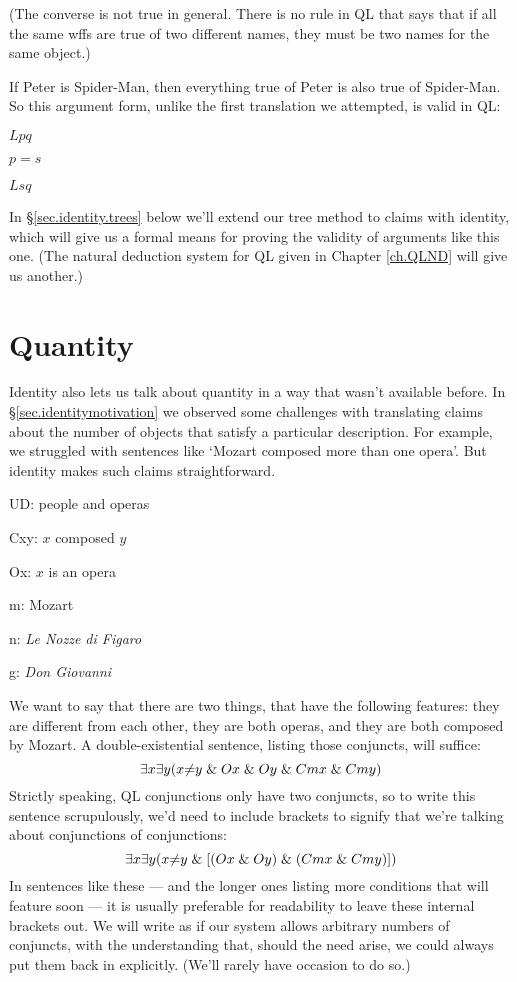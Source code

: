 (The converse is not true in general. There is no rule in QL that says that if all the same wffs are true of two different names, they must be two names for the same object.)

If Peter is Spider-Man, then everything true of Peter is also true of Spider-Man. So this argument form, unlike the first translation we attempted, is valid in QL:

\begin{earg}
\item[] $Lpq$
\item[] $p{=}s$
\item[\therefore] $Lsq$
\end{earg}

In \S\ref{sec.identity.trees} below we'll extend our tree method to claims with identity, which will give us a formal means for proving the validity of arguments like this one. (The natural deduction system for QL given in Chapter \ref{ch.QLND} will give us another.)





\section{Quantity}
\label{sec.quantity}

Identity also lets us talk about quantity in a way that wasn't available before. In \S\ref{sec.identitymotivation} we observed some challenges with translating claims about the number of objects that satisfy a particular description. For example, we struggled with sentences like `Mozart composed more than one opera'. But identity makes such claims straightforward.

\begin{ekey}
\item[UD:] people and operas
\item[Cxy:] $x$ composed $y$
\item[Ox:] $x$ is an opera
\item[m:] Mozart
\item[n:] \emph{Le Nozze di Figaro}
\item[g:] \emph{Don Giovanni}
\end{ekey}

We want to say that there are two things, that have the following features: they are different from each other, they are both operas, and they are both composed by Mozart. A double-existential sentence, listing those conjuncts, will suffice: 
$$\exists x \exists y (x {\neq} y \mathrel\& Ox \mathrel\& Oy \mathrel\& Cmx \mathrel\& Cmy)$$
Strictly speaking, QL conjunctions only have two conjuncts, so to write this sentence scrupulously, we'd need to include brackets to signify that we're talking about conjunctions of conjunctions:
$$\exists x \exists y (x {\neq} y \mathrel\& [(Ox \mathrel\& Oy) \mathrel\& (Cmx \mathrel\& Cmy)])$$
In sentences like these --- and the longer ones listing more conditions that will feature soon --- it is usually preferable for readability to leave these internal brackets out. We will write as if our system allows arbitrary numbers of conjuncts, with the understanding that, should the need arise, we could always put them back in explicitly. (We'll rarely have occasion to do so.)

